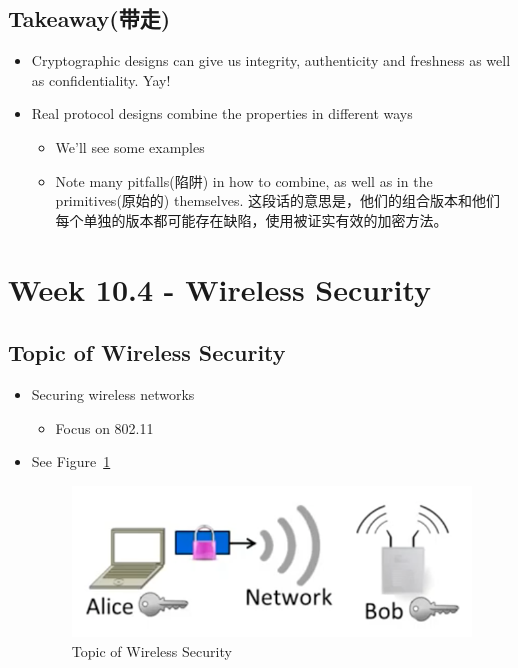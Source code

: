 \documentclass[12pt]{ctexart}   %
\begin{document}
	\subsection{Takeaway(带走)}
	\begin{itemize}
		\item Cryptographic designs can give us integrity, authenticity and freshness as well as confidentiality. Yay!
		
		\item Real protocol designs combine the properties in different ways
		\begin{itemize}
			\item We'll see some examples
			\item Note many pitfalls(陷阱) in how to combine, as well as in the primitives(原始的) themselves. 这段话的意思是，他们的组合版本和他们每个单独的版本都可能存在缺陷，使用被证实有效的加密方法。
		\end{itemize}
	\end{itemize}

\section{Week 10.4 - Wireless Security}
	\subsection{Topic of Wireless Security}
	\begin{itemize}
		\item Securing wireless networks 
		\begin{itemize}
			\item Focus on 802.11
		\end{itemize}
		\item See Figure~\ref{fig:10-4-1}
		  
		\begin{figure}[h!] %
		\centering
		\includegraphics[scale=0.7]{images/10-4-1}
		\caption{Topic of Wireless Security}
		\label{fig:10-4-1}
		\end{figure}
	\end{itemize}
\end{document}
